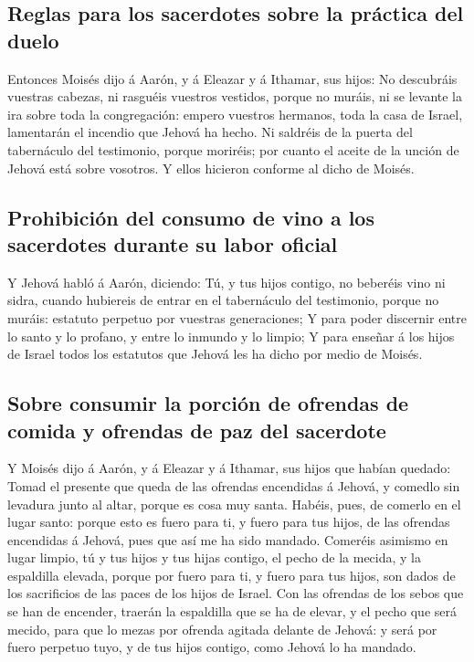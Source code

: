 \hypertarget{reglas-para-los-sacerdotes-sobre-la-pruxe1ctica-del-duelo}{%
\subsection{Reglas para los sacerdotes sobre la práctica del
duelo}\label{reglas-para-los-sacerdotes-sobre-la-pruxe1ctica-del-duelo}}

 Entonces Moisés dijo á Aarón, y á Eleazar y á Ithamar,
sus hijos: No descubráis vuestras cabezas, ni rasguéis vuestros
vestidos, porque no muráis, ni se levante la ira sobre toda la
congregación: empero vuestros hermanos, toda la casa de Israel,
lamentarán el incendio que Jehová ha hecho.  Ni saldréis
de la puerta del tabernáculo del testimonio, porque moriréis; por cuanto
el aceite de la unción de Jehová está sobre vosotros. Y ellos hicieron
conforme al dicho de Moisés.

\hypertarget{prohibiciuxf3n-del-consumo-de-vino-a-los-sacerdotes-durante-su-labor-oficial}{%
\subsection{Prohibición del consumo de vino a los sacerdotes durante su
labor
oficial}\label{prohibiciuxf3n-del-consumo-de-vino-a-los-sacerdotes-durante-su-labor-oficial}}

 Y Jehová habló á Aarón, diciendo:  Tú, y
tus hijos contigo, no beberéis vino ni sidra, cuando hubiereis de entrar
en el tabernáculo del testimonio, porque no muráis: estatuto perpetuo
por vuestras generaciones;  Y para poder discernir entre
lo santo y lo profano, y entre lo inmundo y lo limpio;  Y
para enseñar á los hijos de Israel todos los estatutos que Jehová les ha
dicho por medio de Moisés.

\hypertarget{sobre-consumir-la-porciuxf3n-de-ofrendas-de-comida-y-ofrendas-de-paz-del-sacerdote}{%
\subsection{Sobre consumir la porción de ofrendas de comida y ofrendas
de paz del
sacerdote}\label{sobre-consumir-la-porciuxf3n-de-ofrendas-de-comida-y-ofrendas-de-paz-del-sacerdote}}

 Y Moisés dijo á Aarón, y á Eleazar y á Ithamar, sus
hijos que habían quedado: Tomad el presente que queda de las ofrendas
encendidas á Jehová, y comedlo sin levadura junto al altar, porque es
cosa muy santa.  Habéis, pues, de comerlo en el lugar
santo: porque esto es fuero para ti, y fuero para tus hijos, de las
ofrendas encendidas á Jehová, pues que así me ha sido mandado.
 Comeréis asimismo en lugar limpio, tú y tus hijos y tus
hijas contigo, el pecho de la mecida, y la espaldilla elevada, porque
por fuero para ti, y fuero para tus hijos, son dados de los sacrificios
de las paces de los hijos de Israel.  Con las ofrendas de
los sebos que se han de encender, traerán la espaldilla que se ha de
elevar, y el pecho que será mecido, para que lo mezas por ofrenda
agitada delante de Jehová: y será por fuero perpetuo tuyo, y de tus
hijos contigo, como Jehová lo ha mandado.

